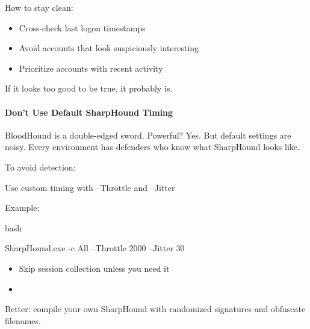 How to stay clean:

\begin{itemize}
    \item Cross-check last logon timestamps

    \item Avoid accounts that look suspiciously interesting

    \item Prioritize accounts with recent activity

\end{itemize}
If it looks too good to be true, it probably is.

\paragraph{\textbf{   Don’t Use Default SharpHound Timing}}

BloodHound is a double-edged sword. Powerful? Yes. But default settings are noisy. Every environment has defenders who know what SharpHound looks like.

To avoid detection:

Use custom timing with --Throttle and --Jitter

 Example:

 bash

 

SharpHound.exe -c All --Throttle 2000 --Jitter 30

\begin{itemize}
    \item Skip session collection unless you need it
    \item %

\end{itemize}
Better: compile your own SharpHound with randomized signatures and obfuscate filenames.

